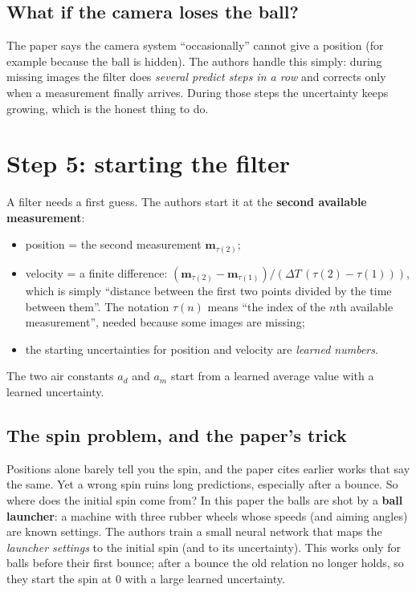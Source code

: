 \documentclass[11pt,a4paper]{article}
\begin{document}
\subsection{What if the camera loses the ball?}
The paper says the camera system ``occasionally'' cannot give a position (for example because
the ball is hidden). The authors handle this simply: during missing images the filter does
\emph{several predict steps in a row} and corrects only when a measurement finally arrives.
During those steps the uncertainty keeps growing, which is the honest thing to do.

\section{Step 5: starting the filter}

A filter needs a first guess. The authors start it at the \textbf{second available measurement}:
\begin{itemize}
\item position = the second measurement $\mathbf m_{\tau(2)}$;
\item velocity = a finite difference: $(\mathbf m_{\tau(2)}-\mathbf m_{\tau(1)})/(\Delta T\,(\tau(2)-\tau(1)))$, which is simply ``distance between the first two points divided by the time between them''. The notation $\tau(n)$ means ``the index of the $n$th available measurement'', needed because some images are missing;
\item the starting uncertainties for position and velocity are \emph{learned numbers}.
\end{itemize}
The two air constants $a_d$ and $a_m$ start from a learned average value with a learned uncertainty.

\subsection{The spin problem, and the paper's trick}
Positions alone barely tell you the spin, and the paper cites earlier works that say the same.
Yet a wrong spin ruins long predictions, especially after a bounce. So where does the initial spin
come from? In this paper the balls are shot by a \textbf{ball launcher}: a machine with three
rubber wheels whose speeds (and aiming angles) are known settings. The authors train a small
neural network that maps the \emph{launcher settings} to the initial spin (and to its uncertainty).
This works only for balls before their first bounce; after a bounce the old relation no longer
holds, so they start the spin at $0$ with a large learned uncertainty.
\end{document}
